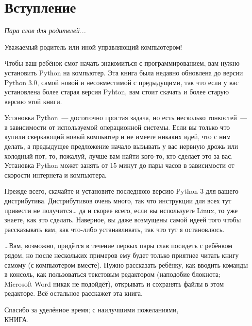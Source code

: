 

\chapter*{Вступление}\normalsize
\begin{center}
{\em Пара слов для родителей...}
\end{center}
\pagestyle{plain}

Уважаемый родитель или иной управляющий компьютером!

Чтобы ваш ребёнок смог начать знакомиться с программированием, вам нужно установить Python на компьютер. Эта книга была недавно обновлена до версии Python 3.0, самой новой и несовместимой с предыдущими, так что если у вас установлена более старая версия Pyhton, вам стоит скачать и более старую версию этой книги.

Установка Python — достаточно простая задача, но есть несколько тонкостей — в зависимости от используемой операционной системы. Если вы только что купили сверкающий новый компьютер и не имеете никаких идей, что с ним делать, а предыдущее предложение начало вызывать у вас нервную дрожь или холодный пот, то, пожалуй, лучше вам найти кого-то, кто сделает это за вас. Установка Python может занять от 15 минут до пары часов в зависимости от скорости интернета и компьютера.

Прежде всего, скачайте и установите последнюю версию Python 3 для вашего дистрибутива. Дистрибутивов очень много, так что инструкции для всех тут привести не получится… да и скорее всего, если вы используете Linux, то уже знаете, как это сделать. Наверное, вы даже возмущены самой идеей того чтобы рассказывать вам, как что-либо устанавливать, так что тут я остановлюсь.


…Вам, возможно, придётся в течение первых пары глав посидеть с ребёнком рядом, но после нескольких примеров ему будет только приятнее читать книгу самому (с компьютером вместе). Нужно рассказать ребёнку, как вводить команды в консоль, как пользоваться текстовым редактором (наподобие блокнота; Microsoft Word никак не подойдёт), открывать и сохранять файлы в этом редакторе. Всё остальное расскажет эта книга.

\vspace{12pt}
\noindent
Спасибо за уделённое время; с наилучшими пожеланиями,\\
КНИГА.
